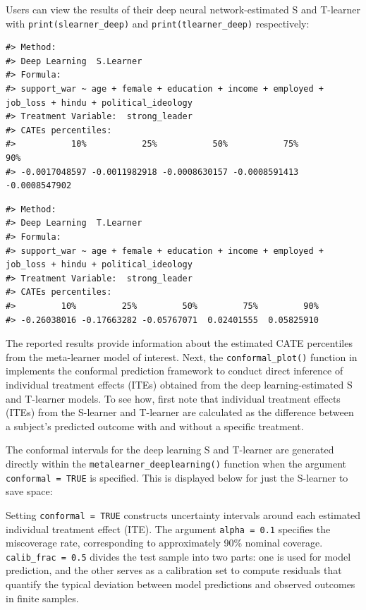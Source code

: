 Users can view the results of their deep neural network-estimated S and
T-learner with \texttt{print(slearner\_deep)} and \texttt{print(tlearner\_deep)}
respectively:

\begin{verbatim}
#> Method:
#> Deep Learning  S.Learner
#> Formula:
#> support_war ~ age + female + education + income + employed +      job_loss + hindu + political_ideology
#> Treatment Variable:  strong_leader
#> CATEs percentiles:
#>           10%           25%           50%           75%           90% 
#> -0.0017048597 -0.0011982918 -0.0008630157 -0.0008591413 -0.0008547902
\end{verbatim}

\begin{verbatim}
#> Method:
#> Deep Learning  T.Learner
#> Formula:
#> support_war ~ age + female + education + income + employed +      job_loss + hindu + political_ideology
#> Treatment Variable:  strong_leader
#> CATEs percentiles:
#>         10%         25%         50%         75%         90% 
#> -0.26038016 -0.17663282 -0.05767071  0.02401555  0.05825910
\end{verbatim}

The reported results provide information about the estimated CATE
percentiles from the meta-learner model of interest. Next, the
\texttt{conformal\_plot()} function in  implements the
conformal prediction framework to conduct direct inference of individual
treatment effects (ITEs) obtained from the deep learning-estimated S and
T-learner models. To see how, first note that individual treatment
effects (ITEs) from the S-learner and T-learner are calculated as the
difference between a subject's predicted outcome with and without a
specific treatment.

The conformal intervals for the deep learning S and T-learner are
generated directly within the \texttt{metalearner\_deeplearning()} function when
the argument \texttt{conformal\ =\ TRUE} is specified. This is displayed below
for just the S-learner to save space:

Setting \texttt{conformal\ =\ TRUE} constructs uncertainty intervals around each
estimated individual treatment effect (ITE). The argument \texttt{alpha\ =\ 0.1}
specifies the miscoverage rate, corresponding to approximately 90\%
nominal coverage. \texttt{calib\_frac\ =\ 0.5} divides the test sample into two
parts: one is used for model prediction, and the other serves as a
calibration set to compute residuals that quantify the typical deviation
between model predictions and observed outcomes in finite samples.

